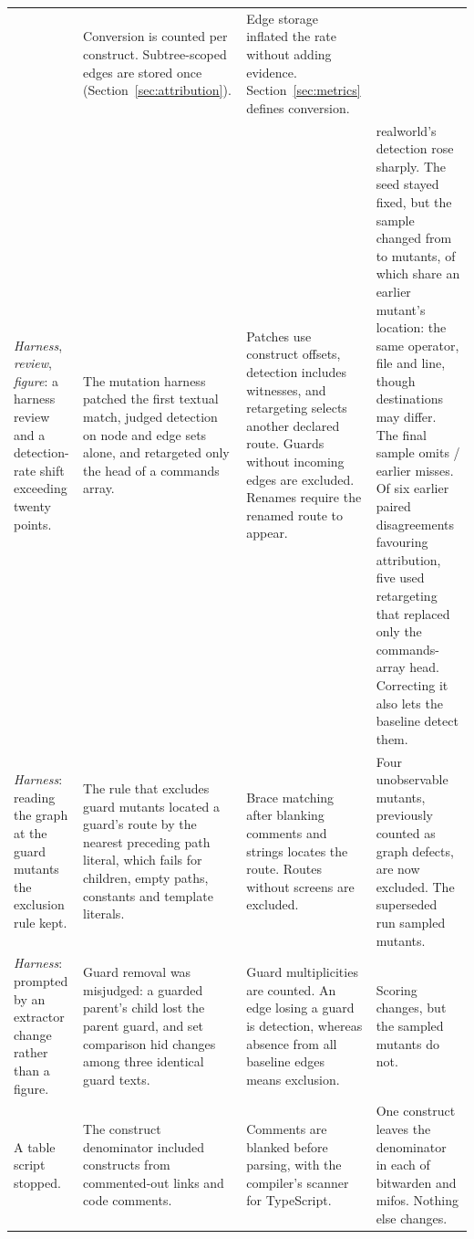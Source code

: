 \begin{xltabular}{\textwidth}{@{}YYYY@{}}
  & Conversion is counted per construct. Subtree-scoped edges are stored once (Section~\ref{sec:attribution}).
  & Edge storage inflated the rate without adding evidence. Section~\ref{sec:metrics} defines conversion. \\
\emph{Harness}, \emph{review}, \emph{figure}: a harness review and a detection-rate shift exceeding twenty points.
  & The mutation harness patched the first textual match, judged detection on node and edge sets alone, and retargeted only the head of a commands array.
  & Patches use construct offsets, detection includes witnesses, and retargeting selects another declared route. Guards without incoming edges are excluded. Renames require the renamed route to appear.
  & realworld's detection rose sharply. The seed stayed fixed, but the sample changed from \MutEarlierSampled{} to \MutSampled{} mutants, of which \MutOverlap{} share an earlier mutant's location: the same operator, file and line, though destinations may differ. The final sample omits \MutEarlierFailuresAbsent{}/\MutEarlierFailures{} earlier misses. Of six earlier paired disagreements favouring attribution, five used retargeting that replaced only the commands-array head. Correcting it also lets the baseline detect them. \\
\emph{Harness}: reading the graph at the guard mutants the exclusion rule kept.
  & The rule that excludes guard mutants located a guard's route by the nearest preceding path literal, which fails for children, empty paths, constants and template literals.
  & Brace matching after blanking comments and strings locates the route. Routes without screens are excluded.
  & Four unobservable mutants, previously counted as graph defects, are now excluded. The superseded run sampled \MutEarlierSampled{} mutants. \\
\emph{Harness}: prompted by an extractor change rather than a figure.
  & Guard removal was misjudged: a guarded parent's child lost the parent guard, and set comparison hid changes among three identical guard texts.
  & Guard multiplicities are counted. An edge losing a guard is detection, whereas absence from all baseline edges means exclusion.
  & Scoring changes, but the sampled mutants do not. \\
A table script stopped.
  & The construct denominator included constructs from commented-out links and code comments.
  & Comments are blanked before parsing, with the compiler's scanner for TypeScript.
  & One construct leaves the denominator in each of bitwarden and mifos. Nothing else changes. \\

\end{xltabular}

